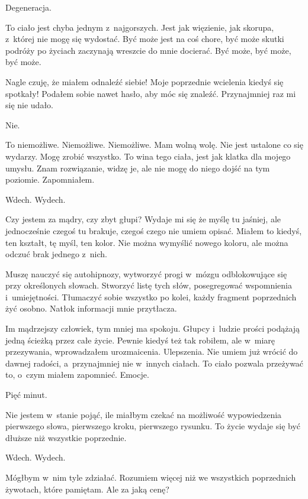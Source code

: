 Degeneracja.

To ciało jest chyba jednym z~najgorszych. Jest jak więzienie, jak skorupa, z~której nie mogę się wydostać. Być może 
jest na coś chore, być może skutki podróży po życiach zaczynają wreszcie do mnie docierać. Być może, być może, być 
może.

Nagle czuję, że miałem odnaleźć siebie! Moje poprzednie wcielenia kiedyś się spotkały! Podałem sobie nawet hasło, aby 
móc się znaleźć. Przynajmniej raz mi się nie udało.

Nie.

To niemożliwe. Niemożliwe. Niemożliwe. Mam wolną wolę. Nie jest ustalone co się wydarzy. Mogę zrobić wszystko. To 
wina tego ciała, jest jak klatka dla mojego umysłu. Znam rozwiązanie, widzę je, ale nie mogę do niego dojść na tym 
poziomie. Zapomniałem.

\begin{itquote}
Wdech. Wydech.
\end{itquote}

Czy jestem za mądry, czy zbyt głupi? Wydaje mi się że myślę tu jaśniej, ale jednocześnie czegoś tu brakuje, czegoś 
czego nie umiem opisać. Miałem to kiedyś, ten kształt, tę myśl, ten kolor. Nie można wymyślić nowego koloru, ale 
można odczuć brak jednego z~nich. 

Muszę nauczyć się autohipnozy, wytworzyć progi w~mózgu odblokowujące się przy określonych słowach. Stworzyć listę 
tych słów, posegregować wspomnienia i~umiejętności. Tłumaczyć sobie wszystko po kolei, każdy fragment poprzednich żyć 
osobno. Natłok informacji mnie przytłacza.

Im mądrzejszy człowiek, tym mniej ma spokoju. Głupcy i~ludzie prości podążają jedną ścieżką przez całe życie. Pewnie 
kiedyś też tak robiłem, ale w~miarę przezywania, wprowadzałem urozmaicenia. Ulepszenia. Nie umiem już wrócić do 
dawnej radości, a~przynajmniej nie w~innych ciałach. To ciało pozwala przeżywać to, o~czym miałem zapomnieć. Emocje.

Pięć minut.

Nie jestem w~stanie pojąć, ile miałbym czekać na możliwość wypowiedzenia pierwszego słowa, pierwszego kroku, 
pierwszego rysunku. To życie wydaje się być dłuższe niż wszystkie poprzednie.

\begin{itquote}
Wdech. Wydech.
\end{itquote}

Mógłbym w~nim tyle zdziałać. Rozumiem więcej niż we wszystkich poprzednich żywotach, które pamiętam. Ale za jaką cenę? 

